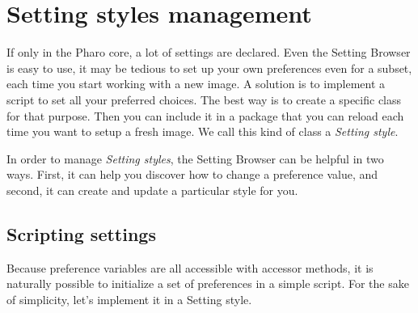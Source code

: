 \documentclass[a4paper,10pt,twoside]{book}
\begin{document}
{%
%
%
%
%

\section{Setting styles management}
\label{sec:SettingStylesManagement}
If only in the Pharo core, a lot of settings are declared. Even the Setting Browser is easy to use, it may be tedious to set up your own preferences even for a subset, each time you start working with a new image. A solution is to implement a script to set all your preferred choices. The best way is to create a specific class for that purpose. Then you can include it in a package that you can reload each time you want to setup a fresh image. We call this kind of class a \textit{Setting style}. 

In order to manage \textit{Setting styles}, the Setting Browser can be helpful in two ways. First, it can help you discover how to change a preference value, and second, it can create and update a particular style for you.

\subsection{Scripting settings}
Because preference variables are all accessible with accessor methods, it is naturally possible to initialize a set of preferences in a simple script. For the sake of simplicity, let's implement it in a Setting style.

}
\end{document}
